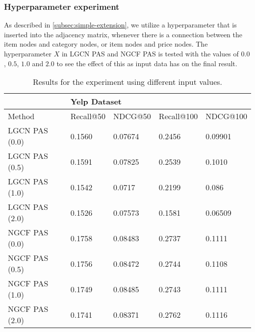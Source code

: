 \subsubsection{Hyperparameter experiment}
As described in \autoref{subsec:simple-extension}, we utilize a hyperparameter that is inserted into the adjacency matrix, whenever there is a connection between the item nodes and category nodes, or item nodes and price nodes.
The hyperparameter $X$ in LGCN PAS and NGCF PAS is tested with the values of $0.0$, $0.5$, $1.0$ and $2.0$ to see the effect of this as input data has on the final result.
\begin{table*}[h!]
    \centering
    \begin{tabular}{|l|l|l|l|l|}
        \hline
        \rowcolor[HTML]{FFFFFF}
                       & \multicolumn{4}{l|}{\cellcolor[HTML]{FFFFFF}Yelp Dataset}                                   \\ \hline
        Method         & Recall@50                                                 & NDCG@50 & Recall@100 & NDCG@100 \\ \hline
        LGCN PAS (0.0) & 0.1560                                                    & 0.07674 & 0.2456     & 0.09901  \\ \hline
        LGCN PAS (0.5) & 0.1591                                                    & 0.07825 & 0.2539     & 0.1010   \\ \hline
        LGCN PAS (1.0) & 0.1542                                                    & 0.0717  & 0.2199     & 0.086    \\ \hline
        LGCN PAS (2.0) & 0.1526                                                    & 0.07573 & 0.1581     & 0.06509  \\ \hline
        NGCF PAS (0.0) & 0.1758                                                    & 0.08483 & 0.2737     & 0.1111   \\ \hline
        NGCF PAS (0.5) & 0.1756                                                    & 0.08472 & 0.2744     & 0.1108   \\ \hline
        NGCF PAS (1.0) & 0.1749                                                    & 0.08485 & 0.2743     & 0.1111   \\ \hline
        NGCF PAS (2.0) & 0.1741                                                    & 0.08371 & 0.2762     & 0.1116   \\ \hline
    \end{tabular}
    \caption{Results for the experiment using different input values.}
    \label{tab:hyperparameter-results}
\end{table*}
